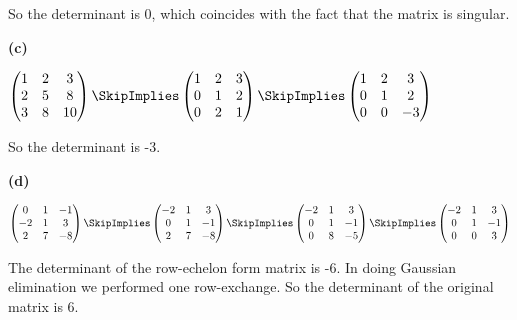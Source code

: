 \documentclass[oneside,12pt]{amsart}
\begin{document}
\bigskip

So the determinant is 0, which coincides with the fact that the matrix is singular.

\textbf{(c)}

\bigskip

$
\begin{pmatrix}
1 & 2 & 3 \\
2 & 5 & 8 \\
3 & 8 & 10
\end{pmatrix}
\SkipImplies
\begin{pmatrix}
1 & 2 & 3 \\
0 & 1 & 2 \\
0 & 2 & 1
\end{pmatrix}
\SkipImplies
\begin{pmatrix}
1 & 2 & 3 \\
0 & 1 & 2 \\
0 & 0 & -3
\end{pmatrix}
$

\bigskip

So the determinant is -3.

\bigskip

\textbf{(d)}

\bigskip

$
\begin{pmatrix}
0 & 1 & -1 \\
-2 & 1 & 3 \\
2 & 7 & -8
\end{pmatrix}
\SkipImplies
\begin{pmatrix}
-2 & 1 & 3 \\
0 & 1 & -1 \\
2 & 7 & -8
\end{pmatrix}
\SkipImplies
\begin{pmatrix}
-2 & 1 & 3 \\
0 & 1 & -1 \\
0 & 8 & -5
\end{pmatrix}
\SkipImplies
\begin{pmatrix}
-2 & 1 & 3 \\
0 & 1 & -1 \\
0 & 0 & 3
\end{pmatrix}
$

\bigskip

The determinant of the row-echelon form matrix is -6. In doing Gaussian elimination
we performed one row-exchange. So the determinant of the original matrix is 6.

\bigskip
\end{document}
